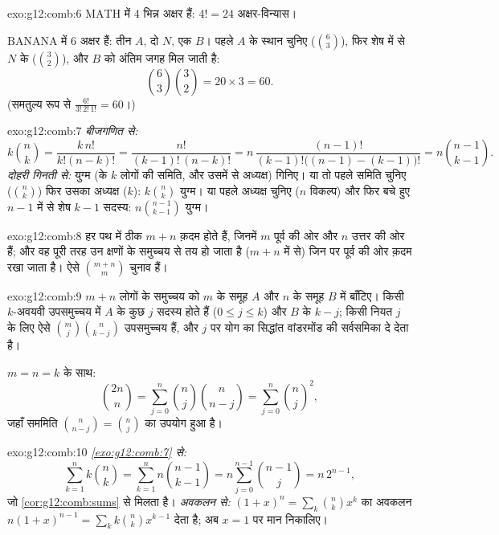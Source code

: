 \begin{solution}{exo:g12:comb:6}
$\mathrm{MATH}$ में 4 भिन्न अक्षर हैं: $4! = 24$ अक्षर-विन्यास।

$\mathrm{BANANA}$ में 6 अक्षर हैं: तीन $A$, दो $N$, एक $B$। पहले $A$ के स्थान
चुनिए ($\binom63$), फिर शेष में से $N$ के ($\binom32$), और $B$ को अंतिम जगह मिल जाती है:
\[
\binom{6}{3}\binom{3}{2} = 20 \times 3 = 60 .
\]
(समतुल्य रूप से $\frac{6!}{3!\,2!\,1!} = 60$।)
\end{solution}

\begin{solution}{exo:g12:comb:7}
\emph{बीजगणित से:}
\[
k\binom nk = \frac{k\,n!}{k!(n-k)!} = \frac{n!}{(k-1)!\,(n-k)!}
= n\,\frac{(n-1)!}{(k-1)!\bigl((n-1)-(k-1)\bigr)!} = n\binom{n-1}{k-1}.
\]
\emph{दोहरी गिनती से:} युग्म (के $k$ लोगों की समिति, और उसमें से अध्यक्ष)
गिनिए। या तो पहले समिति चुनिए ($\binom nk$) फिर उसका अध्यक्ष ($k$): $k\binom nk$ युग्म। या
पहले अध्यक्ष चुनिए ($n$ विकल्प) और फिर बचे हुए $n-1$ में से शेष $k-1$ सदस्य:
$n\binom{n-1}{k-1}$ युग्म।
\end{solution}

\begin{solution}{exo:g12:comb:8}
हर पथ में ठीक $m + n$ क़दम होते हैं, जिनमें $m$ पूर्व की ओर और $n$ उत्तर की ओर
हैं; और वह पूरी तरह उन क्षणों के समुच्चय से तय हो जाता है ($m+n$ में से) जिन
पर पूर्व की ओर क़दम रखा जाता है। ऐसे $\binom{m+n}{m}$ चुनाव हैं।
\end{solution}

\begin{solution}{exo:g12:comb:9}
$m + n$ लोगों के समुच्चय को $m$ के समूह $A$ और $n$ के समूह $B$ में बाँटिए।
किसी $k$-अवयवी उपसमुच्चय में $A$ के कुछ $j$ सदस्य होते हैं ($0 \leq j \leq k$) और $B$
के $k - j$; किसी नियत $j$ के लिए ऐसे $\binom mj \binom{n}{k-j}$ उपसमुच्चय हैं, और $j$ पर योग का
सिद्धांत वांडरमोंड की सर्वसमिका दे देता है।

$m = n = k$ के साथ:
\[
\binom{2n}{n} = \sum_{j=0}^n \binom nj \binom{n}{n-j}
= \sum_{j=0}^n \binom nj^{2},
\]
जहाँ सममिति $\binom{n}{n-j} = \binom nj$ का उपयोग हुआ है।
\end{solution}

\begin{solution}{exo:g12:comb:10}
\emph{\cref{exo:g12:comb:7} से:}
\[
\sum_{k=1}^n k\binom nk = \sum_{k=1}^n n\binom{n-1}{k-1}
= n\sum_{j=0}^{n-1}\binom{n-1}{j} = n\,2^{n-1},
\]
जो \cref{cor:g12:comb:sums} से मिलता है। \emph{अवकलन से:} $(1+x)^n = \sum_k \binom nk x^k$ का अवकलन $n(1+x)^{n-1} = \sum_k k \binom nk x^{k-1}$ देता है; अब $x = 1$ पर
मान निकालिए।
\end{solution}


